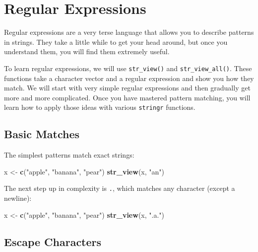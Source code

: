 \documentclass[]{book}
\newenvironment{Shaded}{\begin{snugshade}}{\end{snugshade}}
\newcommand{\KeywordTok}[1]{\textcolor[rgb]{0.13,0.29,0.53}{\textbf{#1}}}
\newcommand{\StringTok}[1]{\textcolor[rgb]{0.31,0.60,0.02}{#1}}
\newcommand{\NormalTok}[1]{#1}
\begin{document}
\section{Regular Expressions}\label{regular-expressions}

Regular expressions are a very terse language that allows you to
describe patterns in strings. They take a little while to get your head
around, but once you understand them, you will find them extremely
useful.

To learn regular expressions, we will use \texttt{str\_view()} and
\texttt{str\_view\_all()}. These functions take a character vector and a
regular expression and show you how they match. We will start with very
simple regular expressions and then gradually get more and more
complicated. Once you have mastered pattern matching, you will learn how
to apply those ideas with various \texttt{stringr} functions.

\subsection{Basic Matches}\label{basic-matches}

The simplest patterns match exact strings:

\begin{Shaded}
\begin{Highlighting}[]
\NormalTok{x <-}\StringTok{ }\KeywordTok{c}\NormalTok{(}\StringTok{"apple"}\NormalTok{, }\StringTok{"banana"}\NormalTok{, }\StringTok{"pear"}\NormalTok{)}
\KeywordTok{str_view}\NormalTok{(x, }\StringTok{"an"}\NormalTok{)}
\end{Highlighting}
\end{Shaded}

\hypertarget{htmlwidget-ac96cb3ee4656e2e9ec3}{}

The next step up in complexity is \texttt{.}, which matches any
character (except a newline):

\begin{Shaded}
\begin{Highlighting}[]
\NormalTok{x <-}\StringTok{ }\KeywordTok{c}\NormalTok{(}\StringTok{"apple"}\NormalTok{, }\StringTok{"banana"}\NormalTok{, }\StringTok{"pear"}\NormalTok{)}
\KeywordTok{str_view}\NormalTok{(x, }\StringTok{".a."}\NormalTok{)}
\end{Highlighting}
\end{Shaded}

\hypertarget{htmlwidget-e5c8c404fe174e4c81bd}{}

\subsection{Escape Characters}\label{escape-characters}
\end{document}

